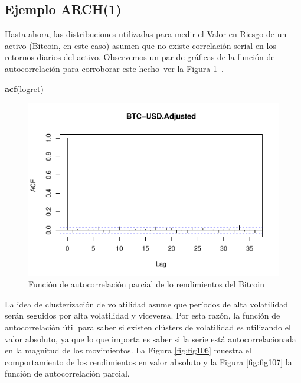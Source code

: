 \documentclass[
]{book}
\newenvironment{Shaded}{\begin{snugshade}}{\end{snugshade}}
\newcommand{\FunctionTok}[1]{\textcolor[rgb]{0.13,0.29,0.53}{\textbf{#1}}}
\newcommand{\NormalTok}[1]{#1}
\begin{document}
\hypertarget{ejemplo-arch1}{%
\subsection{Ejemplo ARCH(1)}\label{ejemplo-arch1}}

Hasta ahora, las distribuciones utilizadas para medir el Valor en Riesgo de un activo (Bitcoin, en este caso) asumen que no existe correlación serial en los retornos diarios del activo. Observemos un par de gráficas de la función de autocorrelación para corroborar este hecho--ver la Figura \ref{fig:fig105}--.

\begin{Shaded}
\begin{Highlighting}[]
\FunctionTok{acf}\NormalTok{(logret)}
\end{Highlighting}
\end{Shaded}

\begin{figure}

{\centering \includegraphics{Notas-Series-Tiempo_files/figure-latex/fig105-1} 

}

\caption{Función de autocorrelación parcial de lo rendimientos del Bitcoin}\label{fig:fig105}
\end{figure}

La idea de clusterización de volatilidad asume que períodos de alta volatilidad serán seguidos por alta volatilidad y viceversa. Por esta razón, la función de autocorrelación útil para saber si existen clústers de volatilidad es utilizando el valor absoluto, ya que lo que importa es saber si la serie está autocorrelacionada en la magnitud de los movimientos. La Figura \ref{fig:fig106} muestra el comportamiento de los rendimientos en valor absoluto y la Figura \ref{fig:fig107} la función de autocorrelación parcial.
\end{document}
